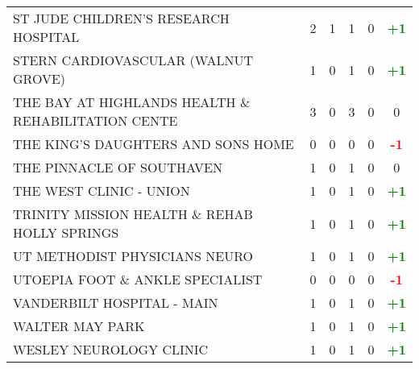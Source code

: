 \documentclass{article}
\begin{document}
\begin{longtable}{l|cccc|c}
    
        ST JUDE CHILDREN'S RESEARCH HOSPITAL & 2 & 1 & 1 & 0 & \textcolor{green}{\textbf{+1}} \\
    

    
        STERN CARDIOVASCULAR (WALNUT GROVE) & 1 & 0 & 1 & 0 & \textcolor{green}{\textbf{+1}} \\
    

    
        THE BAY AT HIGHLANDS HEALTH \& REHABILITATION CENTE & 3 & 0 & 3 & 0 & 0 \\
    

    
        THE KING'S DAUGHTERS AND SONS HOME & 0 & 0 & 0 & 0 & \textcolor{red}{\textbf{-1}} \\
    

    
        THE PINNACLE OF SOUTHAVEN & 1 & 0 & 1 & 0 & 0 \\
    

    
        THE WEST CLINIC - UNION & 1 & 0 & 1 & 0 & \textcolor{green}{\textbf{+1}} \\
    

    
        TRINITY MISSION HEALTH \& REHAB HOLLY SPRINGS & 1 & 0 & 1 & 0 & \textcolor{green}{\textbf{+1}} \\
    

    
        UT METHODIST PHYSICIANS NEURO & 1 & 0 & 1 & 0 & \textcolor{green}{\textbf{+1}} \\
    

    
        UTOEPIA FOOT \& ANKLE SPECIALIST & 0 & 0 & 0 & 0 & \textcolor{red}{\textbf{-1}} \\
    

    
        VANDERBILT HOSPITAL - MAIN & 1 & 0 & 1 & 0 & \textcolor{green}{\textbf{+1}} \\
    

    
        WALTER MAY PARK & 1 & 0 & 1 & 0 & \textcolor{green}{\textbf{+1}} \\
    

    
        WESLEY NEUROLOGY CLINIC & 1 & 0 & 1 & 0 & \textcolor{green}{\textbf{+1}} \\
    


\end{longtable}
\end{document}
